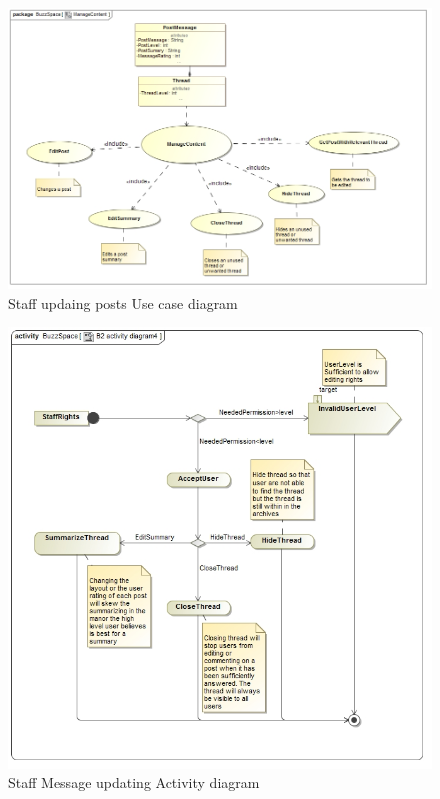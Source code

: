 \documentclass[11pt]{article}
\begin{document}
\begin{enumerate}
\begin{itemize}
 \graphicspath{ {../Diagrams/Andrew/} }
			 \begin{figure}[H]	
			 	  			\includegraphics[scale=0.5]{B2UseCase.png}
							\caption{Staff updaing posts Use case diagram}
			 	  		\end{figure}
			 	  					 	  		\begin{figure}[H]		
			 	  					 	  			\includegraphics[scale=0.5]{B2Activity.png}
			 	  									\caption{Staff Message updating Activity diagram}
			 	  					 	  		\end{figure}
			 	  					 	  		

\end{itemize}
\end{enumerate}
\end{document}

